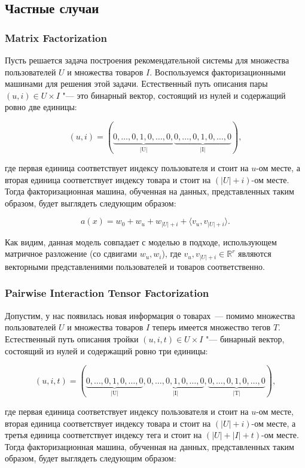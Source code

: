 \documentclass[12pt,a4paper]{article}
\begin{document}
\subsection{Частные случаи}
\subsubsection{Matrix Factorization}

Пусть решается задача построения рекомендательной системы для множества пользователей $U$ и множества товаров $I$. Воспользуемся факторизационными машинами для решения этой задачи. Естественный путь описания пары $(u,i) \in U\times I$ "--- это бинарный вектор, состоящий из нулей и содержащий ровно две единицы:

\[
  (u,i) = (\underbrace{0,\ldots, 0, 1, 0, \ldots, 0,}_\text{|U|} \underbrace{0,\ldots, 0, 1, 0, \ldots, 0}_\text{|I|}),
\] 

где первая единица соответствует индексу пользователя и стоит на $u$-ом месте, а вторая единица соответствует индексу товара и стоит на $(|U| + i)$-ом месте. Тогда факторизационная машина, обученная на данных, представленных таким образом, будет выглядеть следующим образом:

\begin{equation}
	a(x) = w_0 + w_u + w_{|U|+i} + \langle v_u, v_{|U| + i}\rangle.
\end{equation}

Как видим, данная модель совпадает с моделью в подходе, использующем матричное разложение (со сдвигами $w_u, w_i$), где $v_{u}, v_{|U|+i} \in \mathbb{R}^{r}$ являются векторными представлениями пользователей и товаров соответственно.

\subsubsection{Pairwise Interaction Tensor Factorization}

Допустим, у нас появилась новая информация о товарах~--- помимо множества пользователей $U$ и множества товаров $I$ теперь имеется множество тегов $T$. Естественный путь описания тройки $(u,i,t) \in U\times I$ "--- бинарный вектор, состоящий из нулей и содержащий ровно три единицы:

\[
  (u,i, t) = (\underbrace{0,\ldots, 0, 1, 0, \ldots, 0}_\text{|U|}, \underbrace{0,\ldots, 0, 1, 0, \ldots, 0}_\text{|I|},\underbrace{0,\ldots, 0, 1, 0, \ldots, 0}_\text{|T|}),
\] 

где первая единица соответствует индексу пользователя и стоит на $u$-ом месте, вторая единица соответствует индексу товара и стоит на $(|U|+i)$-ом месте, а третья единица соответствует индексу тега и стоит на $(|U|+|I|+t)$-ом месте. Тогда факторизационная машина, обученная на данных, представленных таким образом, будет выглядеть следующим образом:
\end{document}
